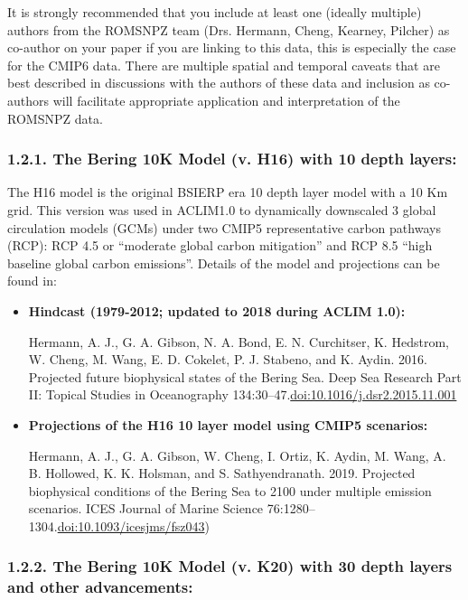 \documentclass[
]{article}
\begin{document}
It is strongly recommended that you include at least one (ideally
multiple) authors from the ROMSNPZ team (Drs. Hermann, Cheng, Kearney,
Pilcher) as co-author on your paper if you are linking to this data,
this is especially the case for the CMIP6 data. There are multiple
spatial and temporal caveats that are best described in discussions with
the authors of these data and inclusion as co-authors will facilitate
appropriate application and interpretation of the ROMSNPZ data.

\hypertarget{the-bering-10k-model-v.-h16-with-10-depth-layers}{%
\subsubsection{1.2.1. The Bering 10K Model (v. H16) with 10 depth
layers:}\label{the-bering-10k-model-v.-h16-with-10-depth-layers}}

The H16 model is the original BSIERP era 10 depth layer model with a 10
Km grid. This version was used in ACLIM1.0 to dynamically downscaled 3
global circulation models (GCMs) under two CMIP5 representative carbon
pathways (RCP): RCP 4.5 or ``moderate global carbon mitigation'' and RCP
8.5 ``high baseline global carbon emissions''. Details of the model and
projections can be found in:

\begin{itemize}
\item
  \textbf{Hindcast (1979-2012; updated to 2018 during ACLIM 1.0):}

  Hermann, A. J., G. A. Gibson, N. A. Bond, E. N. Curchitser, K.
  Hedstrom, W. Cheng, M. Wang, E. D. Cokelet, P. J. Stabeno, and K.
  Aydin. 2016. Projected future biophysical states of the Bering Sea.
  Deep Sea Research Part II: Topical Studies in Oceanography
  134:30--47.\href{http://dx.doi.org/10.1016/j.dsr2.2015.11.001}{doi:10.1016/j.dsr2.2015.11.001}
\item
  \textbf{Projections of the H16 10 layer model using CMIP5 scenarios:}

  Hermann, A. J., G. A. Gibson, W. Cheng, I. Ortiz, K. Aydin, M. Wang,
  A. B. Hollowed, K. K. Holsman, and S. Sathyendranath. 2019. Projected
  biophysical conditions of the Bering Sea to 2100 under multiple
  emission scenarios. ICES Journal of Marine Science
  76:1280--1304.\href{https://academic.oup.com/icesjms/article/76/5/1280/5477847?login=true}{doi:10.1093/icesjms/fsz043})
\end{itemize}

\hypertarget{the-bering-10k-model-v.-k20-with-30-depth-layers-and-other-advancements}{%
\subsubsection{1.2.2. The Bering 10K Model (v. K20) with 30 depth layers
and other
advancements:}\label{the-bering-10k-model-v.-k20-with-30-depth-layers-and-other-advancements}}
\end{document}
